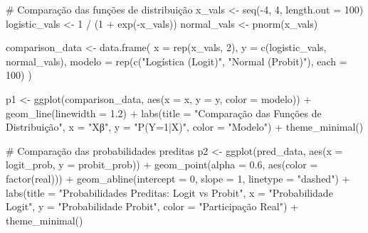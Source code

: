 \documentclass[
  letterpaper,
  DIV=11,
  numbers=noendperiod]{scrartcl}
\newenvironment{Shaded}{\begin{snugshade}}{\end{snugshade}}
\newcommand{\AttributeTok}[1]{\textcolor[rgb]{0.40,0.45,0.13}{#1}}
\newcommand{\CommentTok}[1]{\textcolor[rgb]{0.37,0.37,0.37}{#1}}
\newcommand{\DecValTok}[1]{\textcolor[rgb]{0.68,0.00,0.00}{#1}}
\newcommand{\FloatTok}[1]{\textcolor[rgb]{0.68,0.00,0.00}{#1}}
\newcommand{\FunctionTok}[1]{\textcolor[rgb]{0.28,0.35,0.67}{#1}}
\newcommand{\NormalTok}[1]{\textcolor[rgb]{0.00,0.23,0.31}{#1}}
\newcommand{\OtherTok}[1]{\textcolor[rgb]{0.00,0.23,0.31}{#1}}
\newcommand{\SpecialCharTok}[1]{\textcolor[rgb]{0.37,0.37,0.37}{#1}}
\newcommand{\StringTok}[1]{\textcolor[rgb]{0.13,0.47,0.30}{#1}}
\begin{document}
\begin{Shaded}
\begin{Highlighting}[]
\CommentTok{\# Comparação das funções de distribuição}
\NormalTok{x\_vals }\OtherTok{\textless{}{-}} \FunctionTok{seq}\NormalTok{(}\SpecialCharTok{{-}}\DecValTok{4}\NormalTok{, }\DecValTok{4}\NormalTok{, }\AttributeTok{length.out =} \DecValTok{100}\NormalTok{)}
\NormalTok{logistic\_vals }\OtherTok{\textless{}{-}} \DecValTok{1} \SpecialCharTok{/}\NormalTok{ (}\DecValTok{1} \SpecialCharTok{+} \FunctionTok{exp}\NormalTok{(}\SpecialCharTok{{-}}\NormalTok{x\_vals))}
\NormalTok{normal\_vals }\OtherTok{\textless{}{-}} \FunctionTok{pnorm}\NormalTok{(x\_vals)}

\NormalTok{comparison\_data }\OtherTok{\textless{}{-}} \FunctionTok{data.frame}\NormalTok{(}
  \AttributeTok{x =} \FunctionTok{rep}\NormalTok{(x\_vals, }\DecValTok{2}\NormalTok{),}
  \AttributeTok{y =} \FunctionTok{c}\NormalTok{(logistic\_vals, normal\_vals),}
  \AttributeTok{modelo =} \FunctionTok{rep}\NormalTok{(}\FunctionTok{c}\NormalTok{(}\StringTok{"Logística (Logit)"}\NormalTok{, }\StringTok{"Normal (Probit)"}\NormalTok{), }\AttributeTok{each =} \DecValTok{100}\NormalTok{)}
\NormalTok{)}

\NormalTok{p1 }\OtherTok{\textless{}{-}} \FunctionTok{ggplot}\NormalTok{(comparison\_data, }\FunctionTok{aes}\NormalTok{(}\AttributeTok{x =}\NormalTok{ x, }\AttributeTok{y =}\NormalTok{ y, }\AttributeTok{color =}\NormalTok{ modelo)) }\SpecialCharTok{+}
  \FunctionTok{geom\_line}\NormalTok{(}\AttributeTok{linewidth =} \FloatTok{1.2}\NormalTok{) }\SpecialCharTok{+}
  \FunctionTok{labs}\NormalTok{(}\AttributeTok{title =} \StringTok{"Comparação das Funções de Distribuição"}\NormalTok{,}
       \AttributeTok{x =} \StringTok{"X\textquotesingle{}β"}\NormalTok{,}
       \AttributeTok{y =} \StringTok{"P(Y=1|X)"}\NormalTok{,}
       \AttributeTok{color =} \StringTok{"Modelo"}\NormalTok{) }\SpecialCharTok{+}
  \FunctionTok{theme\_minimal}\NormalTok{()}

\CommentTok{\# Comparação das probabilidades preditas}
\NormalTok{p2 }\OtherTok{\textless{}{-}} \FunctionTok{ggplot}\NormalTok{(pred\_data, }\FunctionTok{aes}\NormalTok{(}\AttributeTok{x =}\NormalTok{ logit\_prob, }\AttributeTok{y =}\NormalTok{ probit\_prob)) }\SpecialCharTok{+}
  \FunctionTok{geom\_point}\NormalTok{(}\AttributeTok{alpha =} \FloatTok{0.6}\NormalTok{, }\FunctionTok{aes}\NormalTok{(}\AttributeTok{color =} \FunctionTok{factor}\NormalTok{(real))) }\SpecialCharTok{+}
  \FunctionTok{geom\_abline}\NormalTok{(}\AttributeTok{intercept =} \DecValTok{0}\NormalTok{, }\AttributeTok{slope =} \DecValTok{1}\NormalTok{, }\AttributeTok{linetype =} \StringTok{"dashed"}\NormalTok{) }\SpecialCharTok{+}
  \FunctionTok{labs}\NormalTok{(}\AttributeTok{title =} \StringTok{"Probabilidades Preditas: Logit vs Probit"}\NormalTok{,}
       \AttributeTok{x =} \StringTok{"Probabilidade Logit"}\NormalTok{,}
       \AttributeTok{y =} \StringTok{"Probabilidade Probit"}\NormalTok{,}
       \AttributeTok{color =} \StringTok{"Participação Real"}\NormalTok{) }\SpecialCharTok{+}
  \FunctionTok{theme\_minimal}\NormalTok{()}


\end{Highlighting}
\end{Shaded}
\end{document}
